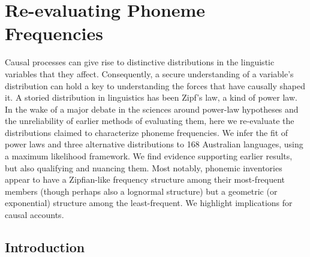 \chapter[Re-evaluating phoneme frequencies]{Re-evaluating Phoneme Frequencies}
\label{Chap:phon-freqs}	%
\pagestyle{headings}

Causal processes can give rise to distinctive distributions in the linguistic variables that they affect. Consequently, a secure understanding of a variable's distribution can hold a key to understanding the forces that have causally shaped it. A storied distribution in linguistics has been Zipf's law, a kind of power law. In the wake of a major debate in the sciences around power-law hypotheses and the unreliability of earlier methods of evaluating them, here we re-evaluate the distributions claimed to characterize phoneme frequencies. We infer the fit of power laws and three alternative distributions to 168 Australian languages, using a maximum likelihood framework. We find evidence supporting earlier results, but also qualifying and nuancing them. Most notably, phonemic inventories appear to have a Zipfian-like frequency structure among their most-frequent members (though perhaps also a lognormal structure) but a geometric (or exponential) structure among the least-frequent. We highlight implications for causal accounts.



\section{Introduction}
\label{Sec:intro}	%


